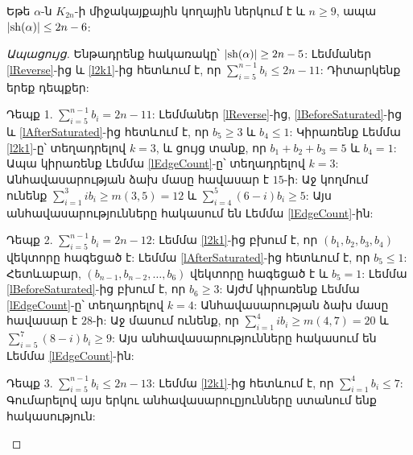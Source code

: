 \begin{hide}
\begin{lemma}
\label{l2n6}
Եթե $\alpha$-ն $K_{2n}$-ի միջակայքային կողային ներկում է և $n\geq 9$, ապա  
$|{\rm sh}(\alpha)| \leq 2n-6$:
\end{lemma}
\begin{proof}[Ապացույց]
Ենթադրենք հակառակը՝ $|{\rm sh}(\alpha)| \geq 2n-5$: Լեմմաներ \ref{lReverse}-ից և \ref{l2k1}-ից հետևում է, որ $\sum\limits_{i=5}^{n-1}{b_i} \leq 2n-11$: Դիտարկենք երեք դեպքեր:
\begin{description}
\item{Դեպք 1.} $\sum\limits_{i=5}^{n-1}{b_i} = 2n-11$: Լեմմաներ \ref{lReverse}-ից, \ref{lBeforeSaturated}-ից և \ref{lAfterSaturated}-ից հետևում է, որ $b_{5} \geq 3$ և $b_{4} \leq 1$: Կիրառենք Լեմմա \ref{l2k1}-ը՝ տեղադրելով $k=3$, և ցույց տանք, որ $b_{1} + b_{2} + b_{3} = 5$ և $b_{4}=1$: Ապա կիրառենք Լեմմա \ref{lEdgeCount}-ը՝ տեղադրելով $k=3$: Անհավասարության ձախ մասը հավասար է $15$-ի: Աջ կողմում ունենք $\sum\limits_{i=1}^{3}{ib_i} \geq m(3,5)=12$ և $\sum\limits_{i=4}^{5}{(6-i)b_i} \geq 5$: Այս անհավասարությունները հակասում են Լեմմա \ref{lEdgeCount}-ին:

\item{Դեպք 2.} $\sum\limits_{i=5}^{n-1}{b_i} = 2n-12$: Լեմմա \ref{l2k1}-ից բխում է, որ $(b_1,b_2,b_3,b_4)$ վեկտորը հագեցած է: Լեմմա \ref{lAfterSaturated}-ից հետևում է, որ $b_5 \leq 1$: Հետևաբար, $(b_{n-1},b_{n-2},\ldots,b_6)$ վեկտորը հագեցած է և $b_5=1$: Լեմմա \ref{lBeforeSaturated}-ից բխում է, որ $b_6 \geq 3$: Այժմ կիրառենք Լեմմա \ref{lEdgeCount}-ը՝ տեղադրելով $k=4$: Անհավասարության ձախ մասը հավասար է $28$-ի: Աջ մասում ունենք, որ $\sum\limits_{i=1}^{4}{ib_i} \geq m(4,7)=20$ և $\sum\limits_{i=5}^{7}{(8-i)b_i} \geq 9$: Այս անհավասարությունները հակասում են Լեմմա \ref{lEdgeCount}-ին:

\item{Դեպք 3.} $\sum\limits_{i=5}^{n-1}{b_i} \leq 2n-13$: Լեմմա \ref{l2k1}-ից հետևում է, որ $\sum\limits_{i=1}^{4}{b_i} \leq 7$: Գումարելով այս երկու անհավասարուըյունները ստանում ենք հակասություն:
\end{description}
\end{proof}


\end{hide}
